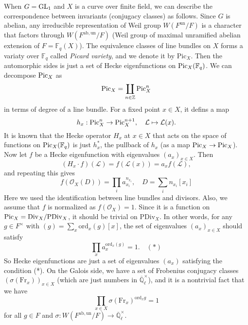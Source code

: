 When $G = \operatorname{\mathrm{GL}}_1$ and $X$ is a curve over finite field, we can describe the correspondence between invariants (conjugacy classes) as follows.
Since $G$ is abelian, any irreducible representation of Weil group $W(F^{\mathrm{un}} / F)$ is a character that factors through $W(F^{\mathrm{ab}, \mathrm{un}} / F)$
(Weil group of maximal unramified abelian extension of $F = \mathbb{F}_q(X)$).
The equivalence classes of line bundles on $X$ forms a variaty over $\mathbb{F}_q$ called \emph{Picard variety}, and we denote it by $\mathrm{Pic}_X$.
Then the automorphic sides is just a set of Hecke eigenfunctions on $\operatorname{\mathrm{Pic}}_X(\mathbb{F}_q)$.
We can decompose $\operatorname{\mathrm{Pic}}_X$ as
$$
\operatorname{\mathrm{Pic}}_X = \coprod_{n \in \mathbb{Z}} \operatorname{\mathrm{Pic}}_X^{n}
$$
in terms of degree of a line bundle. For a fixed point $x\in X$, it defins a map
$$
h_{x}: \operatorname{\mathrm{Pic}}_{X}^{n} \to \operatorname{\mathrm{Pic}}_X^{n+1}, \quad \mathcal{L} \mapsto \mathcal{L}(x).
$$
It is known that the Hecke operator $H_x$ at $x \in X$ that acts on the space of functions on $\operatorname{\mathrm{Pic}}_X(\mathbb{F}_q)$ is just $h_{x}^{*}$, the pullback of $h_{x}$ (as a map $\operatorname{\mathrm{Pic}}_X \to \operatorname{\mathrm{Pic}}_X$).
Now let $f$ be a Hecke eigenfunction with eigenvalues $(a_x)_{x \in X}$.
Then
$$
(H_x \cdot f)(\mathcal{L}) = f(\mathcal{L}(x)) = a_{x} f(\mathcal{L}),
$$
and repeating this gives
$$
f(\mathcal{O}_X(D)) = \prod_{i} a_{x_i}^{n_{x_i}}, \quad D = \sum_{i} n_{x_i} [x_i]
$$
Here we used the identification between line bundles and divisors.
Also, we assume that $f$ is normalized as $f(\mathcal{O}_X) = 1$.
Since it is a function on $\operatorname{\mathrm{Pic}}_X = \mathrm{Div}_X /\mathrm{PDiv}_X$, it should be trivial on $\mathrm{PDiv}_X$.
In other words, for any $g \in F^{\times}$ with $(g) = \sum_{x}  \mathrm{ord}_x(g)[x]$, 
the set of eigenvalues $(a_x)_{x\in X}$ should satisfy
$$
\prod_x a_{x}^{\mathrm{ord}_{x}(g)} = 1. \quad (*)
$$
So Hecke eigenfunctions are just a set of eigenvalues $(a_x)$ satisfying the condition (*).
On the Galois side, we have a set of Frobenius conjugacy classes $(\sigma(\mathrm{Fr}_x))_{x \in X}$ (which are just numbers in $\overline{\mathbb{Q}}_{\ell}^\times$),
and it is a nontrivial fact that we have 
$$
\prod_{x\in X} \sigma(\mathrm{Fr}_x)^{\mathrm{ord}_{x}g} = 1
$$
for all $g \in F$ and $\sigma: W(F^{\mathrm{ab,un}}/F) \to \overline{\mathbb{Q}}_{\ell}^{\times}$.
